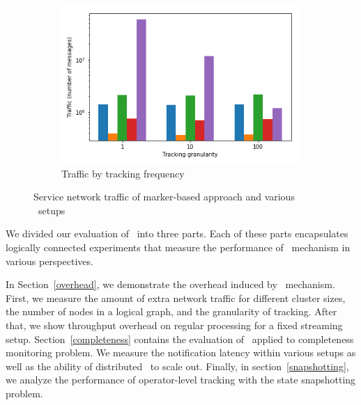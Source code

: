 \begin{figure}[t!]
    \begin{subfigure}[b]{0.32\textwidth}
            \includegraphics[width=0.99\textwidth]{pics/traffic_by_tracking_frequency_bars.png}
            \caption{Traffic by tracking frequency}
            \label{traffic_granularity}
	\end{subfigure}
    \caption{Service network traffic of marker-based approach and various \tracker\ setups}
    \label{traffic_plots}
\end{figure}

\label {fs-acker-experiments}

We divided our evaluation of \tracker\ into three parts. Each of these parts encapsulates logically connected experiments that measure the performance of \tracker\ mechanism in various perspectives.

In Section~\ref{overhead}, we demonstrate the overhead induced by \tracker\ mechanism. First, we measure the amount of extra network traffic for different cluster sizes, the number of nodes in a logical graph, and the granularity of tracking. 
After that, we show throughput overhead on regular processing for a fixed streaming setup. Section~\ref{completeness} contains the evaluation of \tracker\ applied to completeness monitoring problem. 
We measure the notification latency within various setups as well as the ability of distributed \tracker\ to scale out. 
Finally, in section~\ref{snapshotting}, we analyze  the performance of operator-level tracking with the state snapshotting problem. 

